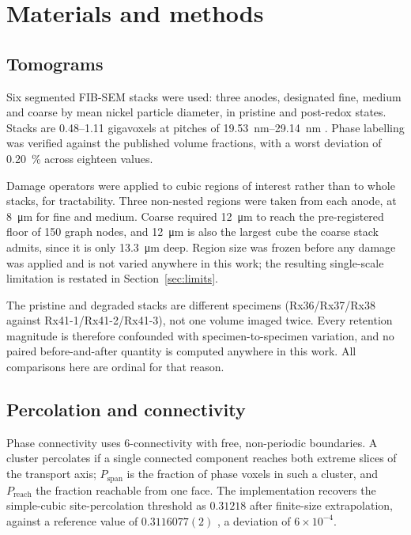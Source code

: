 \documentclass[5p,times,twocolumn]{elsarticle}
\newcommand{\Pspan}{P_{\mathrm{span}}}
\newcommand{\Preach}{P_{\mathrm{reach}}}
\begin{document}
\section{Materials and methods}

\subsection{Tomograms}

Six segmented FIB-SEM stacks were used: three anodes, designated fine, medium
and coarse by mean nickel particle diameter, in pristine and post-redox states.
Stacks are \numrange{0.48}{1.11} gigavoxels at pitches of
\SIrange{19.53}{29.14}{\nano\metre} \cite{pecho2015transport,pecho2015tpb}.
Phase labelling was verified against the published volume fractions, with a
worst deviation of \SI{0.20}{\percent} across eighteen values.

Damage operators were applied to cubic regions of interest rather than to
whole stacks, for tractability. Three non-nested regions were taken from each
anode, at \SI{8}{\micro\metre} for fine and medium. Coarse required
\SI{12}{\micro\metre} to reach the pre-registered floor of 150 graph nodes,
and \SI{12}{\micro\metre} is also the largest cube the coarse stack admits,
since it is only \SI{13.3}{\micro\metre} deep. Region size was frozen before
any damage was applied and is not varied anywhere in this work; the resulting
single-scale limitation is restated in Section~\ref{sec:limits}.

The pristine and degraded stacks are different specimens (Rx36/Rx37/Rx38
against Rx41-1/Rx41-2/Rx41-3), not one volume imaged twice. Every retention
magnitude is therefore confounded with specimen-to-specimen variation, and no
paired before-and-after quantity is computed anywhere in this work. All comparisons here are ordinal for that reason.

\subsection{Percolation and connectivity}

Phase connectivity uses 6-connectivity with free, non-periodic boundaries. A
cluster percolates if a single connected component reaches both extreme slices
of the transport axis; $\Pspan$ is the fraction of phase voxels in such a
cluster, and $\Preach$ the fraction reachable from one face. The
implementation recovers the simple-cubic site-percolation threshold as
$0.31218$ after finite-size extrapolation, against a reference value of
$0.3116077(2)$ \cite{wang2013}, a deviation of $6\times10^{-4}$.
\end{document}
